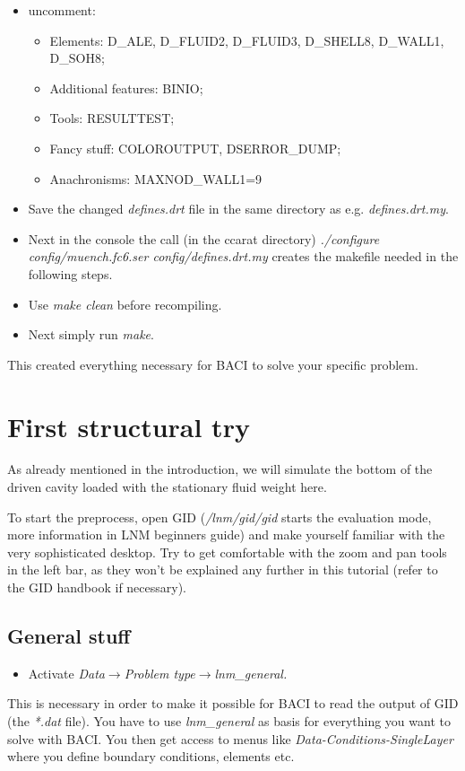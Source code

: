 \begin{itemize}
\item uncomment:

\begin{itemize}
\item Elements: D\_ALE, D\_FLUID2, D\_FLUID3, D\_SHELL8, D\_WALL1, D\_SOH8;
\item Additional features: BINIO;
\item Tools: RESULTTEST;
\item Fancy stuff: COLOROUTPUT, DSERROR\_DUMP;
\item Anachronisms: MAXNOD\_WALL1=9
\end{itemize}
\item Save the changed \emph{defines.drt} file in the same directory as e.g.
\emph{defines.drt.my}. 
\item Next in the console the call (in the ccarat directory) \emph{./configure
config/muench.fc6.ser config/defines.drt.my} creates the makefile needed
in the following steps. 
\item Use \emph{make clean} before recompiling. 
\item Next simply run \emph{make}.
\end{itemize}
This created everything necessary for BACI to solve your specific
problem.


\section{First structural try}

As already mentioned in the introduction, we will simulate the bottom
of the driven cavity loaded with the stationary fluid weight here.

To start the preprocess, open GID (\emph{/lnm/gid/gid} starts the evaluation 
mode, more information in LNM beginners guide) and make yourself familiar with
the very sophisticated desktop. Try to get comfortable with the zoom
and pan tools in the left bar, as they won't be explained any further
in this tutorial (refer to the GID handbook if necessary).


\subsection{General stuff}

\begin{itemize}
\item Activate \emph{Data$\to$Problem type$\to$lnm\_general.}
\end{itemize}
This is necessary in order to make it possible for BACI to read the
output of GID (the \emph{{*}.dat} file). You have to use \emph{lnm\_general}
as basis for everything you want to solve with BACI. You then get
access to menus like \emph{Data-Conditions-SingleLayer} where you
define boundary conditions, elements etc.

